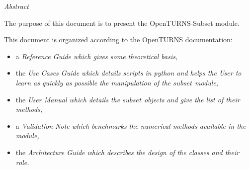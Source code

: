 %  
\vspace{0.5in}
\begin{center}
\vspace{0.3in}
\emph{ Abstract}
\vspace{0.5in}
\end{center}

The purpose of this document is to present the OpenTURNS-Subset module.

This document is organized according to the OpenTURNS documentation:
\begin{itemize}
\item a \itshape{Reference Guide} which gives some theoretical basis,
\item the \itshape{Use Cases Guide} which details scripts in python and helps the User to learn as quickly as possible the manipulation of the $subset$ module,
\item the \itshape{User Manual} which details the $subset$ objects and give the list of their methods,
\item a \itshape{Validation Note} which benchmarks the numerical methods available in the module,
\item the \itshape{Architecture Guide} which describes the design of the classes and their role.
\end{itemize}

